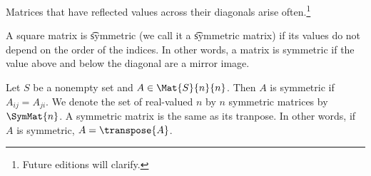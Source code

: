 

Matrices that have reflected values across their diagonals arise often.\footnote{Future editions will clarify.}


A square matrix is \t{symmetric} (we call it a \t{symmetric matrix}) if its values do not depend on the order of the indices.
In other words, a matrix is symmetric if the value above and below the diagonal are a mirror image.


Let $S$ be a nonempty set and $A \in \Mat{S}{n}{n}$.
Then $A$ is symmetric if $A_{ij} = A_{ji}$.
We denote the set of real-valued $n$ by $n$
symmetric matrices by $\SymMat{n}$.
A symmetric matrix is the same as its tranpose.
In other words, if $A$ is symmetric, $A = \transpose{A}$.

\blankpage
